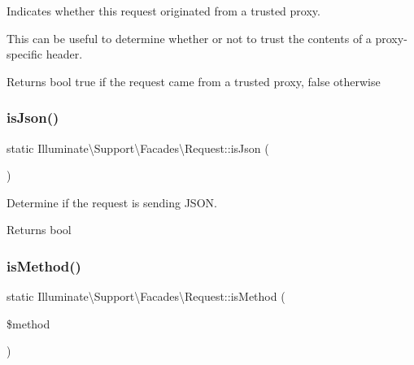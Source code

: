 Indicates whether this request originated from a trusted proxy.

This can be useful to determine whether or not to trust the contents of a proxy-\/specific header.

\begin{DoxyReturn}{Returns}
bool true if the request came from a trusted proxy, false otherwise 
\end{DoxyReturn}
\mbox{\label{class_illuminate_1_1_support_1_1_facades_1_1_request_aeb9496ac11c40327963f0fa71425b37e}} 
\subsubsection{\texorpdfstring{is\+Json()}{isJson()}}
{\footnotesize\ttfamily static Illuminate\textbackslash{}\+Support\textbackslash{}\+Facades\textbackslash{}\+Request\+::is\+Json (\begin{DoxyParamCaption}{ }\end{DoxyParamCaption})\hspace{0.3cm}{\ttfamily [static]}}

Determine if the request is sending J\+S\+ON.

\begin{DoxyReturn}{Returns}
bool 
\end{DoxyReturn}
\mbox{\label{class_illuminate_1_1_support_1_1_facades_1_1_request_a3711d10d844d086b2cd27c7c7ed1d76f}} 
\subsubsection{\texorpdfstring{is\+Method()}{isMethod()}}
{\footnotesize\ttfamily static Illuminate\textbackslash{}\+Support\textbackslash{}\+Facades\textbackslash{}\+Request\+::is\+Method (\begin{DoxyParamCaption}\item[{}]{\$method }\end{DoxyParamCaption})\hspace{0.3cm}{\ttfamily [static]}}

